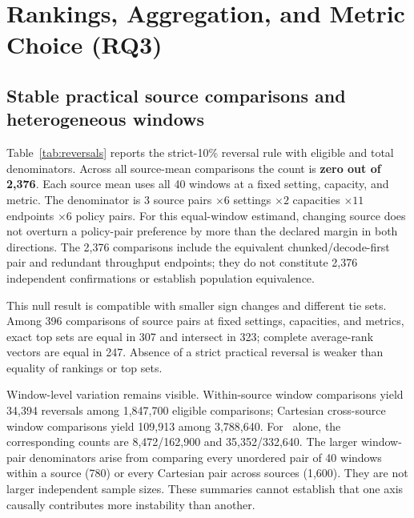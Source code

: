 \section{Rankings, Aggregation, and Metric Choice (RQ3)}\label{sec:rankings}
\subsection{Stable practical source comparisons and heterogeneous windows}
Table~\ref{tab:reversals} reports the strict-10\% reversal rule with eligible
and total denominators. Across all source-mean comparisons the count is
\textbf{zero out of 2,376}. Each source mean uses all 40 windows at a fixed
setting, capacity, and metric. The denominator is
$3$ source pairs $\times6$ settings $\times2$ capacities $\times11$ endpoints
$\times6$ policy pairs. For this equal-window estimand, changing source does not overturn a
policy-pair preference by more than the declared margin in both directions.
The 2,376 comparisons include the equivalent chunked/decode-first pair and
redundant throughput endpoints; they do not constitute 2,376 independent
confirmations or establish population equivalence.

This null result is compatible with smaller sign changes and different tie
sets. Among 396 comparisons of source pairs at fixed settings, capacities,
and metrics, exact top
sets are equal in 307 and intersect in 323; complete average-rank vectors
are equal in 247. Absence of a strict practical reversal is weaker than equality of rankings
or top sets.

\begin{table}[t]
\centering\small\setlength{\tabcolsep}{4pt}
\caption{Strict-10\% practical reversals. Nonzero ties remain in eligible
denominators; a zero losing value is unestimable. All counts include six
policy pairs and the declared endpoints. Reused windows and overlapping
pairs make these dependent descriptive counts, not independent trials.}
\label{tab:reversals}
\end{table}

Window-level variation remains visible. Within-source window comparisons
yield 34,394 reversals among 1,847,700 eligible comparisons; Cartesian
cross-source window comparisons yield 109,913 among 3,788,640. For \anwg\
alone, the corresponding counts are 8,472/162,900 and 35,352/332,640.
The larger window-pair denominators arise from comparing every unordered
pair of 40 windows within a source (780) or every Cartesian pair across
sources (1,600). They are not larger independent sample sizes. These
summaries cannot establish that one axis causally contributes more
instability than another.

